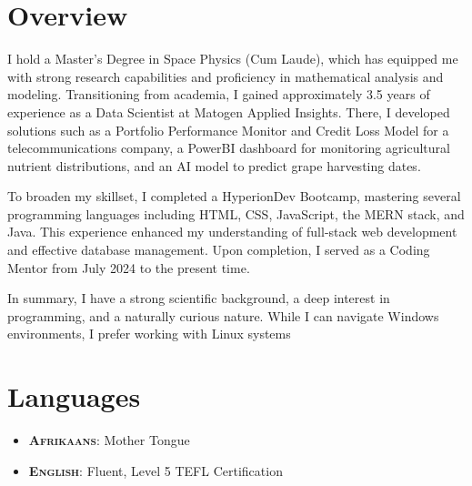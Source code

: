 \documentclass[a4paper,10pt]{article}
\begin{document}
\section*{Overview}
I hold a Master's Degree in Space Physics (Cum Laude), which has equipped me with strong research capabilities and proficiency in mathematical analysis and modeling. Transitioning from academia, I gained approximately 3.5 years of experience as a Data Scientist at Matogen Applied Insights. There, I developed solutions such as a Portfolio Performance Monitor and Credit Loss Model for a telecommunications company, a PowerBI dashboard for monitoring agricultural nutrient distributions, and an AI model to predict grape harvesting dates.

To broaden my skillset, I completed a HyperionDev Bootcamp, mastering several programming languages including HTML, CSS, JavaScript, the MERN stack, and Java. This experience enhanced my understanding of full-stack web development and effective database management. Upon completion, I served as a Coding Mentor from July 2024 to the present time.

In summary, I have a strong scientific background, a deep interest in programming, and a naturally curious nature. While I can navigate Windows environments, I prefer working with Linux systems {\faLinux}
\section*{Languages}
\begin{itemize}
	\item \textsc{\textbf{Afrikaans}}: Mother Tongue
	\item \textsc{\textbf{English}}: Fluent, Level 5 TEFL Certification
\end{itemize}
\end{document}
